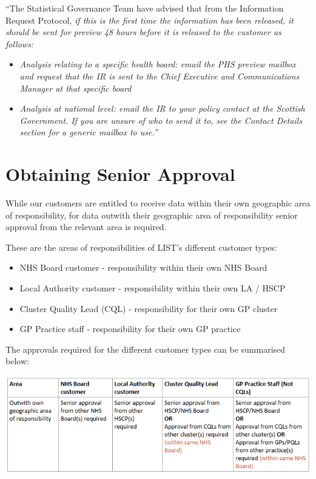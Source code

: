 \documentclass[
]{book}
\begin{document}
``The Statistical Governance Team have advised that from the Information Request Protocol, \emph{if this is the first time the information has been released, it should be sent for preview 48 hours before it is released to the customer as follows:}

\begin{itemize}
\item
  \emph{Analysis relating to a specific health board: email the PHS preview mailbox and request that the IR is sent to the Chief Executive and Communications Manager at that specific board}
\item
  \emph{Analysis at national level: email the IR to your policy contact at the Scottish Government. If you are unsure of who to send it to, see the Contact Details section for a generic mailbox to use.''}
\end{itemize}

\hypertarget{obtaining-senior-approval}{%
\section{Obtaining Senior Approval}\label{obtaining-senior-approval}}

While our customers are entitled to receive data within their own geographic area of responsibility, for data outwith their geographic area of responsibility senior approval from the relevant area is required.

These are the areas of responsibilities of LIST's different customer types:

\begin{itemize}
\item
  NHS Board customer - responsibility within their own NHS Board
\item
  Local Authority customer - responsibility within their own LA / HSCP
\item
  Cluster Quality Lead (CQL) - responsibility for their own GP cluster
\item
  GP Practice staff - responsibility for their own GP practice
\end{itemize}

The approvals required for the different customer types can be summarised below:

\includegraphics[width=1\linewidth]{imgs/seniorapproval-table}
\end{document}
